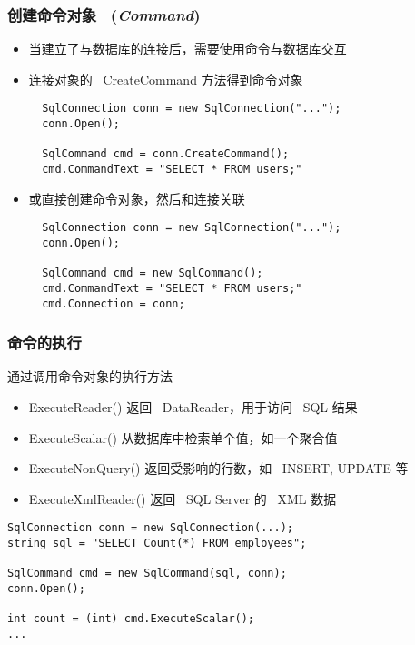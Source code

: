 \begin{frame}[fragile]
\frametitle{创建命令对象 ~(\textit{Command})}
\begin{itemize}
\item 当建立了与数据库的连接后，需要使用命令与数据库交互
\item 连接对象的 ~CreateCommand 方法得到命令对象
\begin{lstlisting}
  SqlConnection conn = new SqlConnection("...");
  conn.Open();

  SqlCommand cmd = conn.CreateCommand();
  cmd.CommandText = "SELECT * FROM users;"
\end{lstlisting}
\item 或直接创建命令对象，然后和连接关联
\begin{lstlisting}
  SqlConnection conn = new SqlConnection("...");
  conn.Open();

  SqlCommand cmd = new SqlCommand();
  cmd.CommandText = "SELECT * FROM users;"
  cmd.Connection = conn;
\end{lstlisting}
\end{itemize}
\end{frame}

\begin{frame}[fragile]
\frametitle{命令的执行}
通过调用命令对象的执行方法

\begin{itemize}
\item \small ExecuteReader() 返回 ~DataReader，用于访问 ~SQL 结果
\item \small ExecuteScalar() 从数据库中检索单个值，如一个聚合值
\item \small ExecuteNonQuery() 返回受影响的行数，如 ~INSERT, UPDATE 等
\item \small ExecuteXmlReader() 返回 ~SQL Server 的 ~XML 数据
\end{itemize}
\begin{lstlisting}
SqlConnection conn = new SqlConnection(...);
string sql = "SELECT Count(*) FROM employees";

SqlCommand cmd = new SqlCommand(sql, conn);
conn.Open();

int count = (int) cmd.ExecuteScalar();
...
\end{lstlisting}
\end{frame}


